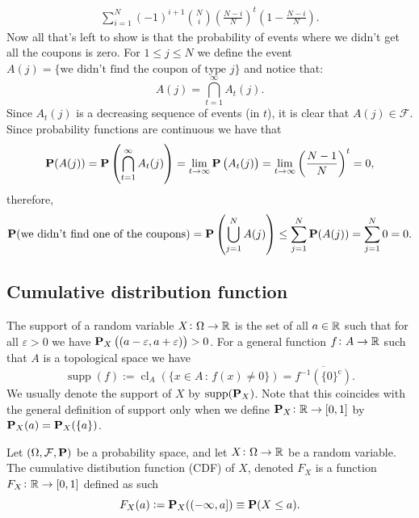 \documentclass[11pt,a4paper]{article}
\begin{document}
\begin{example}
\begin{align*}
    \sum_{i=1}^{N}(-1)^{i+1}\binom{N}{i}\left(\frac{N-i}{N}\right)^{t}
    \left(1 - \frac{N-i}{N}\right).
  \end{align*}
  Now all that's left to show is that the probability of events where we
  didn't get all the coupons is zero. For $1 \le j \le N$ we define the
  event $A(j) = \{\text{we didn't find the coupon of type $j$}\}$ and notice
  that:
  \[
    A(j) = \bigcap_{t=1}^{\infty} A_t(j).
  \]
  Since $A_t(j)$ is a decreasing sequence of events (in $t$), it is clear
  that $A(j) \in \mathcal F$. Since probability functions are continuous
  we have that
  \[
    \mathbf{P}(A(j)) =
    \mathbf{P}\left(\bigcap_{t=1}^{\infty}A_{t}(j)\right) =
    \lim_{t\to\infty}\mathbf{P}\left(A_{t}(j)\right) =
    \lim_{t\to\infty}\left({\frac{N-1}{N}}\right)^{t}=0,
  \]
  therefore,
  \[
    \mathbf{P}(\text{we didn't find one of the coupons}) =
    \mathbf{P}\left(\bigcup_{j=1}^{N} A(j)\right) \leq
    \sum_{j=1}^{N} \mathbf{P}(A(j)) =
    \sum_{j=1}^{N} 0 =
    0.
  \]
\end{example}

\subsection{Cumulative distribution function}

\begin{definition}[Support]
  The support of a random variable $X \colon \Omega \to \mathbb{R}$ is the set of all $a \in \mathbb{R}$
  such that for all $\varepsilon > 0$ we have 
  $\mathbf{P}_X\left((a - \varepsilon, a + \varepsilon)\right) > 0$.
  For a general function $f \colon A \to \mathbb{R}$ such that $A$ is a topological
  space we have
  \[
    \operatorname {supp} (f) := 
    \operatorname {cl}_{A} 
    \left(\{x\in A\,:\,f(x)\neq 0\}\right) =
    {\overline {f^{-1}\left(\{0\}^{\mathrm {c} }\right)}}.
  \]
  We usually denote the support of $X$ by $\operatorname{supp}(\mathbf{P}_X)$.
  Note that this coincides with the general definition of support
  only when we define $\mathbf{P}_X \colon \mathbb{R} \to [0,1]$ by
  $\mathbf{P}_X(a) = \mathbf{P}_X(\left\{a\right\})$.
\end{definition}
\begin{definition}
  Let $(\Omega, \mathcal F, \mathbf{P})$ be a probability space,
  and let $X \colon \Omega \to \mathbb{R}$ be a random variable.
  The cumulative distibution function (CDF) of $X$, denoted $F_X$ is
  a function $F_X \colon \mathbb{R} \to [0,1]$ defined as such
  \[
    F_{X}(a) := \mathbf{P}_{X}((-\infty,a]) \equiv \mathbf{P}(X \leq a).
  \]
\end{definition}
\end{document}
